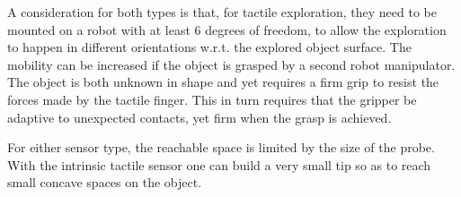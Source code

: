 A consideration for both types is that, for tactile exploration, they need to be mounted on a robot with at least $6$ degrees of freedom, to allow the exploration to happen in different orientations w.r.t. the explored object surface. The mobility can be increased if the object is grasped by a second robot manipulator. The object is both unknown in shape and yet requires a firm grip to resist the forces made by the tactile finger. This in turn requires that the gripper be adaptive to unexpected contacts, yet firm when the grasp is achieved.

For either sensor type, the reachable space is limited by the size of the probe. With the intrinsic tactile sensor one can build a very small tip so as to reach small concave spaces on the object.


%

